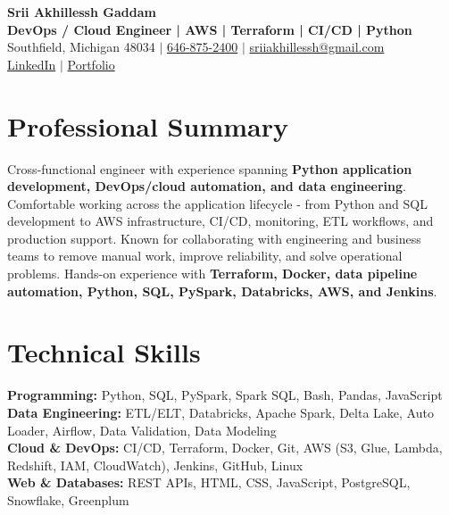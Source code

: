 \documentclass[letterpaper,10pt]{article}
\begin{document}
\fontsize{9.35pt}{10.45pt}\selectfont

\begin{center}
    {\LARGE \textbf{Srii Akhillessh Gaddam}} \\[-1pt]
    \textbf{DevOps / Cloud Engineer | AWS | Terraform | CI/CD | Python} \\[2pt]
    Southfield, Michigan 48034 $|$
    \href{tel:6468752400}{646-875-2400} $|$
    \href{mailto:sriiakhillessh@gmail.com}{sriiakhillessh@gmail.com} \\[1pt]
    \href{https://www.linkedin.com/in/srii-akhiilessh-gaddam-b48668191/}{LinkedIn} $|$
    \href{https://sriiakhillesshg.github.io/portfolio/}{Portfolio}
\end{center}
\vspace{-8pt}

\section{Professional Summary}
\small{Cross-functional engineer with experience spanning \textbf{Python application development, DevOps/cloud automation, and data engineering}. Comfortable working across the application lifecycle - from Python and SQL development to AWS infrastructure, CI/CD, monitoring, ETL workflows, and production support. Known for collaborating with engineering and business teams to remove manual work, improve reliability, and solve operational problems. Hands-on experience with \textbf{Terraform, Docker, data pipeline automation, Python, SQL, PySpark, Databricks, AWS, and Jenkins}.}

\section{Technical Skills}
\small{
\textbf{Programming:} Python, SQL, PySpark, Spark SQL, Bash, Pandas, JavaScript \\
\textbf{Data Engineering:} ETL/ELT, Databricks, Apache Spark, Delta Lake, Auto Loader, Airflow, Data Validation, Data Modeling \\
\textbf{Cloud \& DevOps:} CI/CD, Terraform, Docker, Git, AWS (S3, Glue, Lambda, Redshift, IAM, CloudWatch), Jenkins, GitHub, Linux \\
\textbf{Web \& Databases:} REST APIs, HTML, CSS, JavaScript, PostgreSQL, Snowflake, Greenplum
}
\end{document}
